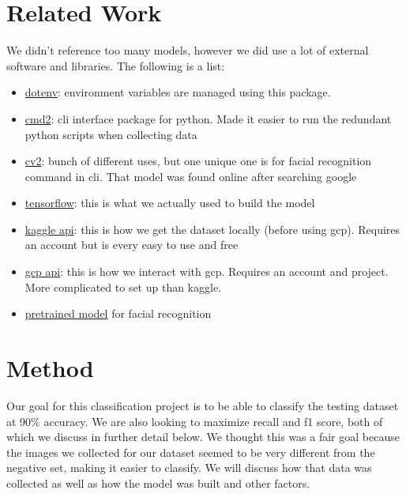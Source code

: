 \section{Related Work}
We didn't reference too many models, however we did use a lot of external software and libraries. The following is a list:
\begin{itemize}
    \item \href{https://pypi.org/project/python-dotenv/}{dotenv}: environment variables are managed using this package.

    \item \href{https://cmd2.readthedocs.io/en/stable/}{cmd2}: cli interface package for python. Made it easier to run the redundant python scripts when collecting data
    
    \item \href{https://pypi.org/project/opencv-python/}{cv2}: bunch of different uses, but one unique one is for facial recognition command in cli. That model was found online after searching google
    
    \item \href{https://www.tensorflow.org/api_docs/python/tf}{tensorflow}: this is what we actually used to build the model 
    \item \href{https://www.kaggle.com/docs/api}{kaggle api}: this is how we get the dataset locally (before using gcp). Requires an account but is every easy to use and free
    \item \href{https://cloud.google.com/python/docs/reference}{gcp api}: this is how we interact with gcp. Requires an account and project. More complicated to set up than kaggle.
    \item \href{https://github.com/chuanqi305/MobileNet-SSD/blob/master/mobilenet_iter_73000.caffemodel}{pretrained model} for facial recognition
    
    
    
\end{itemize}

\section{Method}
Our goal for this classification project is to be able to classify the testing dataset at 90\% accuracy. We are also looking to maximize recall and f1 score, both of which we discuss in further detail below. 
We thought this was a fair goal because the images we collected for our dataset seemed to be very different 
from the negative set, making it easier to classify. We will discuss how that data was collected as well as how the model was built and other factors.

